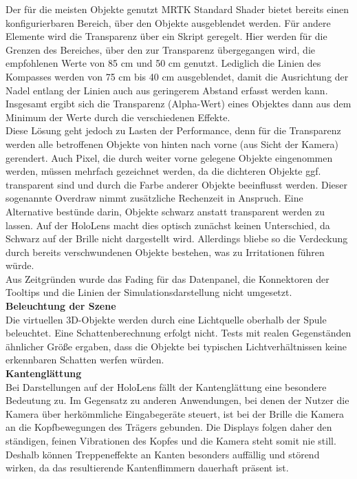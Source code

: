 Der für die meisten Objekte genutzt MRTK Standard Shader bietet bereits einen konfigurierbaren Bereich, über den Objekte ausgeblendet werden. Für andere Elemente wird die Transparenz über ein Skript geregelt. Hier werden für die Grenzen des Bereiches, über den zur Transparenz übergegangen wird, die empfohlenen Werte von 85 cm und 50 cm genutzt. Lediglich die Linien des Kompasses werden von 75 cm bis 40 cm ausgeblendet, damit die Ausrichtung der Nadel entlang der Linien auch aus geringerem Abstand erfasst werden kann. Insgesamt ergibt sich die Transparenz (Alpha-Wert) eines Objektes dann aus dem Minimum der Werte durch die verschiedenen Effekte.\\

Diese Lösung geht jedoch zu Lasten der Performance, denn für die Transparenz werden alle betroffenen Objekte von hinten nach vorne (aus Sicht der Kamera) gerendert. Auch Pixel, die durch weiter vorne gelegene Objekte eingenommen werden, müssen mehrfach gezeichnet werden, da die dichteren Objekte ggf. transparent sind und durch die Farbe anderer Objekte beeinflusst werden. Dieser sogenannte Overdraw nimmt zusätzliche Rechenzeit in Anspruch. Eine Alternative bestünde darin, Objekte schwarz anstatt transparent werden zu lassen. Auf der HoloLens macht dies optisch zunächst keinen Unterschied, da Schwarz auf der Brille nicht dargestellt wird. Allerdings bliebe so die Verdeckung durch bereits verschwundenen Objekte bestehen, was zu Irritationen führen würde.\\

Aus Zeitgründen wurde das Fading für das Datenpanel, die Konnektoren der Tooltips und die Linien der Simulationsdarstellung nicht umgesetzt.\\

\textbf{Beleuchtung der Szene}\\
Die virtuellen 3D-Objekte werden durch eine Lichtquelle oberhalb der Spule beleuchtet. Eine Schattenberechnung erfolgt nicht. Tests mit realen Gegenständen ähnlicher Größe ergaben, dass die Objekte bei typischen Lichtverhältnissen keine erkennbaren Schatten werfen würden.\\

\textbf{Kantenglättung}\\
Bei Darstellungen auf der HoloLens fällt der Kantenglättung eine besondere Bedeutung zu. Im Gegensatz zu anderen Anwendungen, bei denen der Nutzer die Kamera über herkömmliche Eingabegeräte steuert, ist bei der Brille die Kamera an die Kopfbewegungen des Trägers gebunden. Die Displays folgen daher den ständigen, feinen Vibrationen des Kopfes und die Kamera steht somit nie still. Deshalb können Treppeneffekte an Kanten besonders auffällig und störend wirken, da das resultierende Kantenflimmern dauerhaft präsent ist.\\

